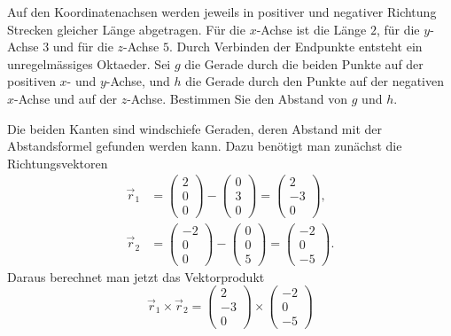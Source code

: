 Auf den Koordinatenachsen werden jeweils in positiver und
negativer Richtung Strecken gleicher Länge abgetragen. Für die
$x$-Achse ist die Länge $2$, für die $y$-Achse $3$ und für die
$z$-Achse $5$. Durch Verbinden der Endpunkte entsteht ein
unregelmässiges Oktaeder. Sei $g$ die
Gerade durch die beiden Punkte auf der positiven $x$- und $y$-Achse,
und $h$ die Gerade durch den Punkte auf der negativen $x$-Achse
und auf der $z$-Achse. Bestimmen Sie den Abstand von $g$ und $h$.


\begin{loesung}
Die beiden Kanten sind windschiefe Geraden, deren Abstand mit
der Abstandsformel gefunden werden kann. Dazu benötigt man zunächst die
Richtungsvektoren
\begin{align*}
\vec r_1&=\begin{pmatrix}2\\0\\0\end{pmatrix}-\begin{pmatrix}0\\3\\0\end{pmatrix}
=
\begin{pmatrix}2\\-3\\0\end{pmatrix}
,\\
\vec r_2&=\begin{pmatrix}-2\\0\\0\end{pmatrix}-\begin{pmatrix}0\\0\\5\end{pmatrix}
=
\begin{pmatrix}-2\\0\\-5\end{pmatrix}
.
\end{align*}
Daraus berechnet man jetzt das Vektorprodukt
\[
\vec r_1\times \vec r_2
=
\begin{pmatrix}2\\-3\\0\end{pmatrix}
\times
\begin{pmatrix}-2\\0\\-5\end{pmatrix}
\]
\end{loesung}

